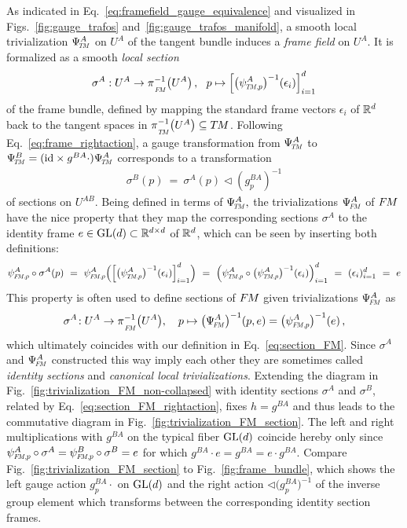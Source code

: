 As indicated in Eq.~\eqref{eq:framefield_gauge_equivalence} and visualized in Figs.~\ref{fig:gauge_trafos} and~\ref{fig:gauge_trafos_manifold}, a smooth local trivialization $\PsiTM^A$ on $U^A$ of the tangent bundle induces a \emph{frame field} on $U^A$.
It is formalized as a smooth \emph{local section}
\begin{align}\label{eq:section_FM}
    \sigma^A:U^A\to \piFM^{-1}\!\left(U^A\right),\ \ p\mapsto \left[\big(\psiTMp^A\big)^{-1}(\epsilon_i)\right]_{i=1}^d
\end{align}
of the frame bundle, defined by mapping the standard frame vectors $\epsilon_i$ of $\mathbb{R}^d$ back to the tangent spaces in $\piTM^{-1}\big(U^A\big)\subseteq \TM$.
Following Eq.~\ref{eq:frame_rightaction}, a gauge transformation from $\PsiTM^A$ to $\PsiTM^B = (\id\times g^{BA}\cdot)\PsiTM^A$ corresponds to a transformation
\begin{align}\label{eq:section_FM_rightaction}
    \sigma^B(p)\ =\ \sigma^A(p) \lhd \left(g^{BA}_p\right)^{-1}
\end{align}
of sections on $U^{AB}$.
Being defined in terms of $\PsiTM^A,$ the trivializations $\PsiFM^A$ of $F\mkern-1.5muM$ have the nice property that they map the corresponding sections $\sigma^A$ to the identity frame $e \in \operatorname{GL}(d) \subset \mathbb{R}^{d\times d}$ of $\mathbb{R}^d$, which can be seen by inserting both definitions:
\begin{align}\label{eq:identity_section_prop}
    \psiFMp^A\circ\sigma^A(p)
    \ =\ \psiFMp^A \Big(\Big[ \big(\psiTMp^A\big)^{-1} (\epsilon_i) \Big]_{i=1}^d \Big)
    \ =\ \Big(\psiTMp^A \circ \big(\psiTMp^A\big)^{-1} (\epsilon_i) \Big)_{i=1}^d
    \ =\ (\epsilon_i)_{i=1}^d
    \ =\ e
\end{align}
This property is often used to define sections of $F\mkern-1.5muM$ given trivializations $\PsiFM^A$ as
\begin{align}\label{eq:identity_section_def}
    \sigma^A\!:U^A\to\piFM^{-1}\big(U^A\big),\ \ \ p \mapsto \big(\PsiFM^A\big)^{-1}(p,e) = \big(\psiFMp^A\big)^{-1}(e) \,,
\end{align}
which ultimately coincides with our definition in Eq.~\eqref{eq:section_FM}.
Since $\sigma^A$ and $\PsiFM^A$ constructed this way imply each other they are sometimes called \emph{identity sections} and \emph{canonical local trivializations}.
Extending the diagram in Fig.~\ref{fig:trivialization_FM_non-collapsed} with identity sections $\sigma^A$ and $\sigma^B$, related by Eq.~\ref{eq:section_FM_rightaction}, fixes $h=g^{BA}$ and thus leads to the commutative diagram in Fig.~\ref{fig:trivialization_FM_section}.
The left and right multiplications with $g^{BA}$ on the typical fiber $\operatorname{GL}(d)$ coincide hereby only since $\psiFMp^A\circ\sigma^A = \psiFMp^B\circ\sigma^B = e$ for which $g^{BA}\cdot e = g^{BA} = e\cdot g^{BA}$.
Compare Fig.~\ref{fig:trivialization_FM_section} to Fig.~\ref{fig:frame_bundle}, which shows the left gauge action $g_p^{BA}\cdot$ on $\operatorname{GL}(d)$ and the right action $\lhd\big( g_p^{BA} \big)^{-1}$ of the inverse group element which transforms between the corresponding identity section frames.











